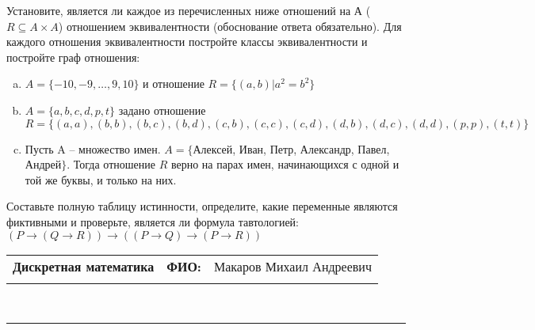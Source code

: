 \documentclass[10pt]{exam}
\newcommand{\class}{Дискретная математика}
\newcommand{\examdate}{}
\begin{document}
\begin{questions}
\question
Установите, является ли каждое из перечисленных ниже отношений на А ($R \subseteq A \times A$) отношением эквивалентности (обоснование ответа обязательно). Для каждого отношения эквивалентности постройте классы 
эквивалентности и постройте граф отношения:
\begin{enumerate} [a)]\setcounter{enumi}{0}
\item $A = \{-10, -9, … , 9, 10\}$ и отношение $R = \{(a,b)|a^{2} = b^{2}\}$
\item $A = \{a, b, c, d, p, t\}$ задано отношение $R = \{(a, a), (b, b), (b, c), (b, d), (c, b), (c, c), (c, d), (d, b), (d, c), (d, d), (p,p), (t,t)\}$
\item Пусть A – множество имен. $A = \{ $Алексей, Иван, Петр, Александр, Павел, Андрей$ \}$. Тогда отношение $R$ верно на парах имен, начинающихся с одной и той же буквы, и только на них.
\end{enumerate}\question Составьте полную таблицу истинности, определите, какие переменные являются фиктивными и проверьте, является ли формула тавтологией:
$(P \rightarrow (Q \rightarrow R)) \rightarrow ((P \rightarrow Q) \rightarrow (P \rightarrow R))$

\end{questions}
\newpage
\begin{flushright}
\begin{tabular}{p{2.8in} r l}
\textbf{\class} & \textbf{ФИО:} &Макаров Михаил Андреевич
\\

\textbf{\examdate} &&\\
\end{tabular}\\
\end{flushright}
\rule[1ex]{\textwidth}{.1pt}
\end{document}
